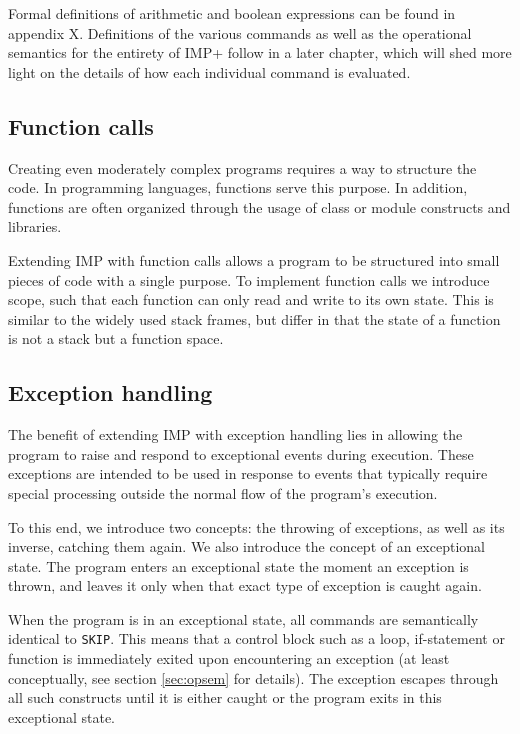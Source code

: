 Formal definitions of arithmetic and boolean expressions can be found in appendix X. Definitions of the various commands as well as the operational semantics for the entirety of IMP+ follow in a later chapter, which will shed more light on the details of how each individual command is evaluated.

\subsection{Function calls}

Creating even moderately complex programs requires a way to structure the code. In programming languages, functions serve this purpose. In addition, functions are often organized through the usage of class or module constructs and libraries.

Extending IMP with function calls allows a program to be structured into small pieces of code with a single purpose. To implement function calls we introduce scope, such that each function can only read and write to its own state. This is similar to the widely used stack frames, but differ in that the state of a function is not a stack but a function space.

\subsection{Exception handling}

The benefit of extending IMP with exception handling lies in allowing the program to raise and respond to exceptional events during execution. These exceptions are intended to be used in response to events that typically require special processing outside the normal flow of the program's execution.

To this end, we introduce two concepts: the throwing of exceptions, as well as its inverse, catching them again. We also introduce the concept of an exceptional state. The program enters an exceptional state the moment an exception is thrown, and leaves it only when that exact type of exception is caught again.

When the program is in an exceptional state, all commands are semantically identical to \verb|SKIP|. This means that a control block such as a loop, if-statement or function is immediately exited upon encountering an exception (at least conceptually, see section \ref{sec:opsem}  for details). The exception escapes through all such constructs until it is either caught or the program exits in this exceptional state.

